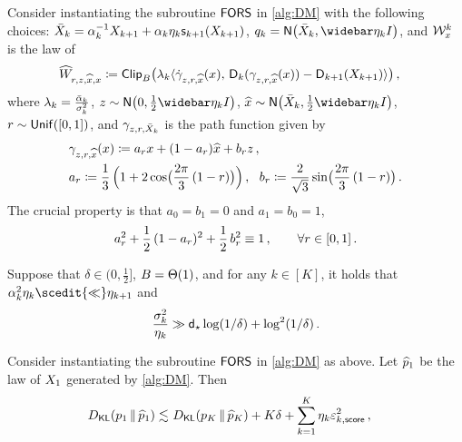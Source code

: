 Consider instantiating the subroutine $\AlgWSC$ in \cref{alg:DM} with the following choices: $\Xbar_k=\alpha_k^{-1} X_{k+1}+\alpha_k \eta_k \scf_{k+1}(X_{k+1})$, $q_k = \normal{\Xbar_k , \etabar_k I}$, and $\mc W_x^k$ is the law of
\begin{align*}
    \widehat W_{r,z,\xhat,x} \deq \mathsf{Clip}_B\bigl(\lambda_k \langle \dot \gamma_{z,r,\xhat}(x),&~\Dn_k(\gamma_{z,r,\xhat}(x)) - \Dn_{k+1}(X_{k+1})\rangle\bigr)\,,
\end{align*}
where $\lambda_k=\frac{\alpbar_k}{\sigma_k^2}$, $z\sim \normal{0,\frac12\etabar_k I}$, $\xhat \sim \normal{\Xbar_k,\frac12\etabar_k I}$, $r\sim\Unif([0,1])$, 
and $\gamma_{z,r,\Xbar_k}$ is the path function given by
\begin{align}
    &\gamma_{z,r,\xhat}(x) \deq\alr x + (1-\alr) \xhat + \blr z\,, \label{eq:path_fn_new_1} \\
    &\alr\deq \frac13\,\prn[\Big]{1+2\cos\prn[\big]{\frac{2\pi}{3}\,(1-r)}}\,, ~~\blr\deq \frac{2}{\sqrt{3}}\sin\prn[\big]{\frac{2\pi}{3}\,(1-r)}\,.\label{eq:path_fn_new_2}
\end{align}
The crucial property is that $a_0=b_1=0$ and $a_1=b_0=1$,
\begin{align}
    \alr^2+\frac{1}{2}\,(1-\alr)^2+\frac12\,\blr^2\equiv 1\,, \qquad \forall r\in[0,1]\,.
\end{align}

\begin{theorem}\label{thm:DM-intrinsic}
Suppose that $\delta\in(0,\frac12]$, $\B=\Theta(1)$, and for any $k\in [K]$, it holds that $\alpha_k^2\eta_k\scedit{\ll} \eta_{k+1}$ and
\begin{align}\label{eq:DM-intrinsic-eta}
    \frac{\sigma_k^2}{\eta_k} \gg \dstar\log(1/\delta)+\log^2(1/\delta)\,.
\end{align}

Consider instantiating the subroutine $\AlgWSC$ in \cref{alg:DM} as above.
Let $\phat_1$ be the law of $\xr{1}$ generated by \cref{alg:DM}. Then
\begin{align*}
    \Dkl{p_1}{\phat_1}\leqsim&~ \kl{p_K}{\phat_K}+K\delta 
    +\sum_{k=1}^{K} \eta_k \epssct^2\,,
\end{align*}
\end{theorem}

